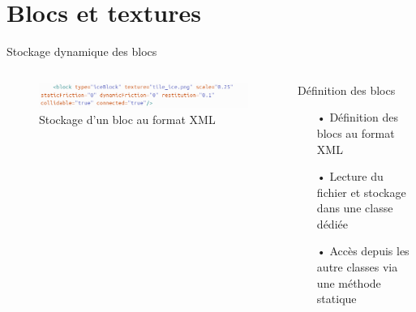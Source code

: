 \documentclass{beamer}
\begin{document}
{\section{Blocs et textures}
\begin{frame}{Stockage dynamique des blocs}
    \begin{columns}
            \begin{figure}
                \centering
                \includegraphics[width=1.0\textwidth]{images/XMLfile.png}
                \caption{Stockage d'un bloc au format XML}
            \end{figure}
            \begin{block}{Définition des blocs}
                \begin{itemize}
                    \item[•] Définition des blocs au format XML
                    \item[•] Lecture du fichier et stockage dans une classe dédiée
                    \item[•] Accès depuis les autre classes via une méthode statique
                \end{itemize}
            \end{block}
    \end{columns}
\end{frame}

}
\end{document}
